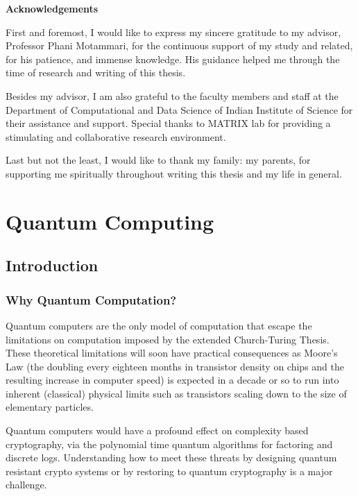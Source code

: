 \documentclass[12pt, oneside]{book}
\theoremstyle{definition}
\theoremstyle{definition}
\theoremstyle{remark}
\newcommand{\acknowledgementsname}{Acknowledgements}
\newenvironment{Acknowledgements}{%
\clearpage
\null\vfill
\begin{center}%
    \bfseries \acknowledgementsname
\end{center}}%
{\vfill\null}
\begin{document}
\begin{Acknowledgements}
First and foremost, I would like to express my sincere gratitude to my advisor,
Professor Phani Motammari, for the continuous support of my study and related, for
his patience, and immense knowledge.
His guidance helped me through the time of research and writing of this thesis.

Besides my advisor, I am also grateful to the faculty members and staff at the
Department of Computational and Data Science of Indian Institute of Science for
their assistance and support. Special thanks to MATRIX lab for providing a stimulating
and collaborative research environment.

Last but not the least, I would like to thank my family: my parents,
for supporting me spiritually throughout writing this thesis and my life in general.
\end{Acknowledgements}

\tableofcontents

\mainmatter

\part{Quantum Computing}
\chapter{Introduction}
\section{Why Quantum Computation?}
Quantum computers are the only model of computation that escape the limitations on computation imposed by the extended Church-Turing Thesis. These theoretical limitations will soon have practical consequences as Moore's Law (the doubling every eighteen months in transistor density on chips and the resulting increase in computer speed) is expected in a decade or so to run into inherent (classical) physical limits such as transistors scaling down to the size of elementary particles. 

Quantum computers would have a profound effect on complexity based cryptography, via the polynomial time quantum algorithms for factoring and discrete logs. Understanding how to meet these threats by designing quantum resistant crypto systems or by restoring to quantum cryptography is a major challenge.
\end{document}

